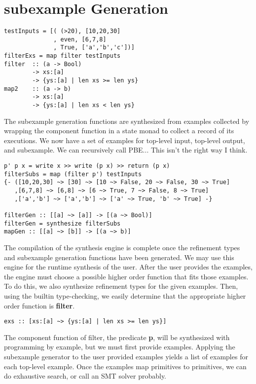 \section{subexample Generation}
\begin{verbatim}
testInputs = [( (>20), [10,20,30]
              , even, [6,7,8]
              , True, ['a','b','c'])]
filterExs = map filter testInputs
filter  :: (a -> Bool)
        -> xs:[a]
        -> {ys:[a] | len xs >= len ys}
map2    :: (a -> b)
        -> xs:[a]
        -> {ys:[a] | len xs < len ys}
\end{verbatim}

The subexample generation functions are synthesized from examples collected by wrapping the component function in a state monad to collect a record of its executions.
We now have a set of examples for top-level input, top-level output, and subexample.
We can recursively call PBE... This isn't the right way I think.


\begin{verbatim}
p' p x = write x >> write (p x) >> return (p x)
filterSubs = map (filter p') testInputs
{- ([10,20,30] ~> [30] ~> [10 ~> False, 20 ~> False, 30 ~> True]
   ,[6,7,8] ~> [6,8] ~> [6 ~> True, 7 ~> False, 8 ~> True]
   ,['a','b'] ~> ['a','b'] ~> ['a' ~> True, 'b' ~> True] -}
   
filterGen :: [[a] ~> [a]] -> [(a ~> Bool)]
filterGen = synthesize filterSubs
mapGen :: [[a] ~> [b]] -> [(a ~> b)]
\end{verbatim}


The compilation of the synthesis engine is complete once the refinement types and subexample generation functions have been generated. We may use this engine for the runtime synthesis of the user. After the user provides the examples, the engine must choose a possible higher order function that fits those examples. To do this, we also synthesize refinement types for the given examples. Then, using the builtin type-checking, we easily determine that the appropriate higher order function is \textbf{filter}.

\begin{verbatim}
exs :: [xs:[a] ~> {ys:[a] | len xs >= len ys}]
\end{verbatim}

The component function of filter, the predicate \textbf{p}, will be synthesized with programming by example, but we must first provide examples. Applying the subexample generator to the user provided examples yields a list of examples for each top-level example. Once the examples map primitives to primitives, we can do exhaustive search, or call an SMT solver probably.

